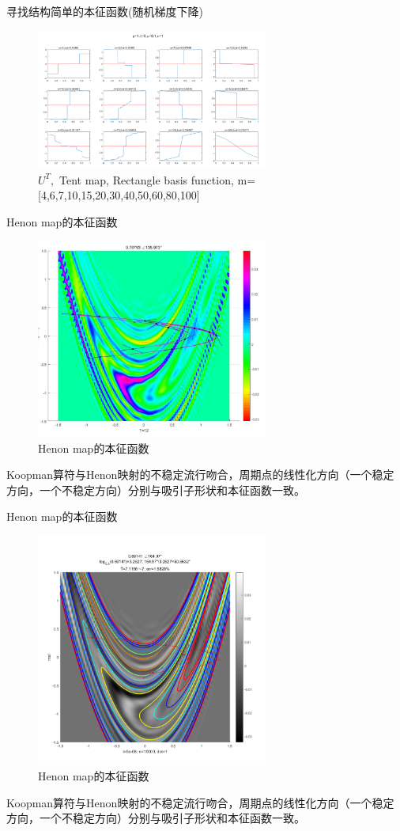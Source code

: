 \documentclass{beamer}
\begin{document}
\begin{frame}{寻找结构简单的本征函数(随机梯度下降)}
\begin{figure}
	\centering
	\includegraphics[width=3in]{figure/tent_svg}
	\caption{$U^T,$ Tent map, Rectangle basis function, m=[4,6,7,10,15,20,30,40,50,60,80,100]}
\end{figure}
\end{frame}

\begin{frame}{Henon map的本征函数}
\begin{figure}
	\centering
	\includegraphics[width=3in]{figure/henon_eigen}
	\caption{Henon map的本征函数}
\end{figure}
Koopman算符与Henon映射的不稳定流行吻合，周期点的线性化方向（一个稳定方向，一个不稳定方向）分别与吸引子形状和本征函数一致。
\end{frame}

\begin{frame}{Henon map的本征函数}
\begin{figure}
	\centering
	\includegraphics[width=3in]{figure/henon_evolution}
	\caption{Henon map的本征函数}
\end{figure}
Koopman算符与Henon映射的不稳定流行吻合，周期点的线性化方向（一个稳定方向，一个不稳定方向）分别与吸引子形状和本征函数一致。
\end{frame}
\end{document}
